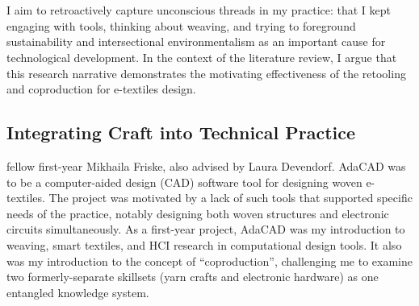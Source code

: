 \section{}
\label{ch_adacad}

I aim to retroactively capture unconscious threads in my practice: that I kept engaging with tools, thinking about weaving, and trying to foreground sustainability and intersectional environmentalism as an important cause for technological development. In the context of the literature review, I argue that this research narrative demonstrates the motivating effectiveness of the retooling and coproduction for e-textiles design.

\subsection{Integrating Craft into Technical Practice }

 fellow first-year Mikhaila Friske, also advised by Laura Devendorf. AdaCAD was to be a computer-aided design (CAD) software tool for designing woven e-textiles. The project was motivated by a lack of such tools that supported specific needs of the practice, notably designing both woven structures and electronic circuits simultaneously. As a first-year project, AdaCAD was my introduction to weaving, smart textiles, and HCI research in computational design tools. It also was my introduction to the concept of ``coproduction'', challenging me to examine two formerly-separate skillsets (yarn crafts and electronic hardware) as one entangled knowledge system.

